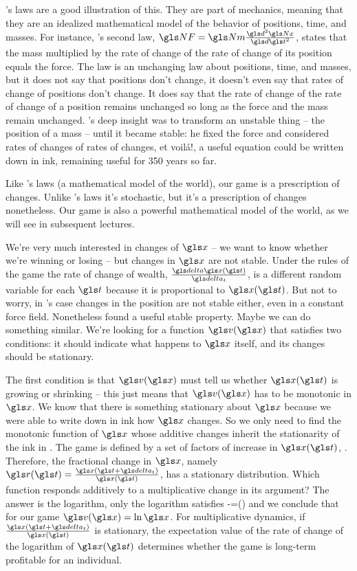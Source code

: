 's laws are a good illustration of this. They are part of mechanics, meaning that they
are an idealized mathematical model of the behavior of positions, time, and masses. 
For instance, 's second law, $\NF=\Nm \frac{\gd^2 \Nx}{\gd\t^2}$, states that the mass multiplied by 
the rate of change of the rate of change of its position equals the force. The law is an unchanging 
law about positions, time, and masses, but it does not say that positions don't change, it doesn't even say 
that rates of change of positions don't change. It does say that the rate of change of the 
rate of change of a position remains unchanged so long as the force and the mass 
remain unchanged. 's deep insight was to transform an unstable thing -- the position of a mass --
until it became stable: he fixed the force and considered rates of changes of rates of changes, et 
voil\'a!, a useful equation could be written down in ink, remaining useful for 350 years so far.

Like 's laws (a mathematical model of the world), our game is a prescription of changes. 
Unlike 's laws it's stochastic, but it's a prescription of changes nonetheless. 
Our game is also a powerful mathematical model of the world, as we will see in subsequent lectures. 

We're very much interested in changes of $\x$ -- we want to know 
whether we're winning or losing -- but changes in $\x$ are not stable. 
Under the rules of the game the rate of change of wealth, $\frac{\d \x(\t)}{\dt}$, is a different 
random variable for each $\t$ because it is proportional to $\x(\t)$. But not to worry, 
in 's case changes in the position are not stable either, even in a 
constant force field. Nonetheless  found a useful stable property. 
Maybe we can do something similar. We're looking for a function $\gv(\x)$ that satisfies two conditions: 
it should indicate what happens to $\x$ itself, and its changes should be stationary.

The first condition is that $\gv(\x)$ must tell us 
whether $\x(\t)$ is growing or shrinking -- this just means that $\gv(\x)$ has to 
be monotonic in $\x$. We know that there is something stationary
about $\x$ because we were able to write down in ink how $\x$ changes. So we only need 
to find the monotonic function of $\x$ whose additive changes inherit the stationarity of the ink in .
The game is defined by a set of factors of increase in $\x(\t)$, . Therefore, the fractional change in $\x$, namely
$\gr(\t) = \frac{\x(\t+\dt)}{\x(\t)}$, has a stationary distribution. Which function responds additively to a multiplicative change in its argument? 
The answer is the logarithm, \ie
only the logarithm satisfies
\be
\gv[\x(\t+\dt)]-\gv[\x(\t)]=\gv \left(\frac{\x(\t+\dt)}{\x(\t)}\right)
\ee
and we conclude that for our game $\gv(\x)=\ln\x$.
For multiplicative dynamics, \ie if $\frac{\x(\t+\dt)}{\x(\t)}$ is stationary, the expectation 
value of the rate of change of the logarithm of $\x(\t)$ determines whether the game is long-term profitable 
for an individual.

